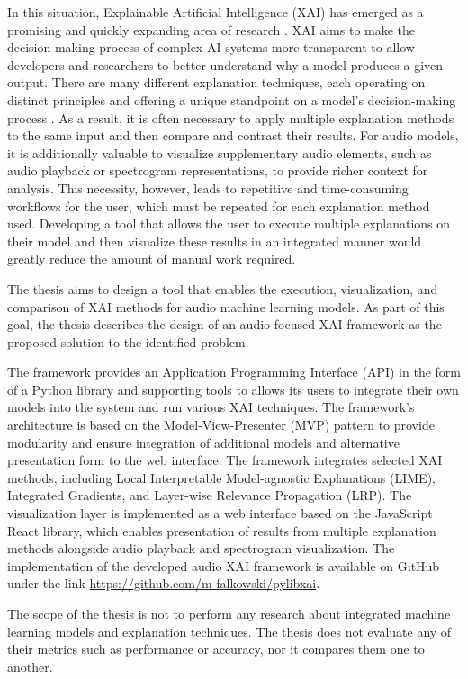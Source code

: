\documentclass[
    bindingoffset=5mm,  %
    footnoteindent=3mm, %
    hyphenation=true    %
]{src/wut-thesis}
\begin{document}
In this situation, Explainable Artificial Intelligence (XAI) has emerged as a promising and quickly expanding area
of research \cite{Arrieta2019-yr}.
XAI aims to make the decision-making process of complex AI systems more transparent to allow developers
and researchers to better understand why a model produces a given output. There are many different explanation
techniques, each operating on distinct principles and offering a unique standpoint
on a model's decision-making process \cite{Abhishek2022-iu}.
As a result, it is often necessary to apply multiple explanation methods to the same input and then compare
and contrast their results. For audio models, it is additionally valuable to visualize supplementary audio elements,
such as audio playback or spectrogram representations, to provide richer context for analysis. This necessity,
however, leads to repetitive and time-consuming workflows for the user, which must be repeated for each
explanation method used. Developing a tool that allows the user to execute multiple explanations on their
model and then visualize these results in an integrated manner would greatly reduce the amount of
manual work required.

The thesis aims to design a tool that enables the execution, visualization, and comparison of XAI methods for
audio machine learning models. As part of this goal, the thesis describes the design of an audio-focused XAI
framework as the proposed solution to the identified problem.

The framework provides an Application Programming Interface (API) in the form of a Python library
and supporting tools to allows its users to integrate their own models into the system and run various XAI techniques.
The framework's architecture is based on the Model-View-Presenter (MVP) pattern to provide modularity and ensure
integration of additional models and alternative presentation form to the web interface. The framework
integrates selected XAI methods, including Local Interpretable Model-agnostic Explanations (LIME), Integrated
Gradients, and Layer-wise Relevance Propagation (LRP). The visualization layer is implemented as a web interface
based on the JavaScript React library, which enables presentation of results from multiple explanation methods
alongside audio playback and spectrogram visualization. The implementation of the developed audio XAI framework is
available on GitHub under the link \href{https://github.com/m-falkowski/pylibxai}{https://github.com/m-falkowski/pylibxai}.

The scope of the thesis is not to perform any research about
integrated machine learning models and explanation techniques. The thesis does not evaluate any of their metrics such
as performance or accuracy, nor it compares them one to another.
\end{document}
